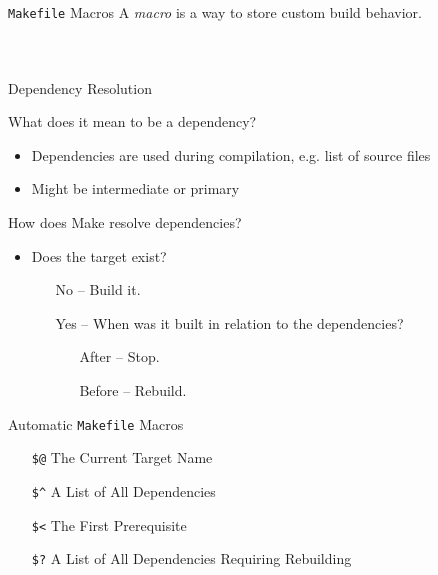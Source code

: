 \documentclass[dvipsnames]{beamer}
\begin{document}
\begin{frame}{\texttt{Makefile} Macros}
	A \emph{macro} is a way to store custom build behavior. 

	\inputminted[frame=lines,firstline=15,lastline=15,fontsize=\scriptsize]{makefile}{scripts/Makefile}
	\inputminted[frame=lines,firstline=25,lastline=26,fontsize=\scriptsize]{makefile}{scripts/Makefile}
	\inputminted[frame=lines,firstline=33,lastline=34,fontsize=\scriptsize]{makefile}{scripts/Makefile} 
\end{frame}

\begin{frame}{Dependency Resolution}
	\begin{block}{What does it mean to be a dependency?}
		\begin{itemize}
			\item Dependencies are used during compilation, e.g. list of source
				files
			\item Might be intermediate or primary 
		\end{itemize}
	\end{block}
	\begin{block}{How does Make resolve dependencies?}
		\begin{itemize}
			\item Does the target exist? 
				\begin{itemize}
					\item[No --] Build it.
					\item[Yes --] When was it built in relation to the
						dependencies?
						\begin{itemize}
							\item[After --] Stop.
							\item[Before --] Rebuild.
						\end{itemize}
				\end{itemize}
		\end{itemize}
	\end{block}
\end{frame}

\begin{frame}{Automatic \texttt{Makefile} Macros}
	\begin{itemize}
		\item[\texttt{\$@}] The Current Target Name
		\item[\texttt{\$\^}] A List of All Dependencies
		\item[\texttt{\$<}] The First Prerequisite
		\item[\texttt{\$?}] A List of All Dependencies Requiring Rebuilding
	\end{itemize}
\end{frame}
\end{document}
